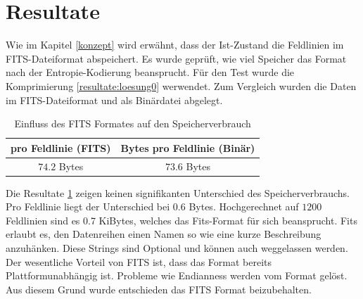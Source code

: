 \section{Resultate}\label{resultate}
Wie im Kapitel \ref{konzept} wird erwähnt, dass der Ist-Zustand die Feldlinien im FITS-Dateiformat abspeichert. Es wurde geprüft, wie viel Speicher das Format nach der Entropie-Kodierung beansprucht. Für den Test wurde die Komprimierung \ref{resultate:loesung0} werwendet. Zum Vergleich wurden die Daten im FITS-Dateiformat und als Binärdatei abgelegt.
\begin{table}[!htbp]
\center
\begin{tabular}{c|c}
	 pro Feldlinie (FITS) & Bytes pro Feldlinie (Binär)\\\hline
	$74.2$ Bytes & $73.6$ Bytes\\
\end{tabular}
\caption{Einfluss des FITS Formates auf den Speicherverbrauch}
\label{resultate:fits_table}
\end{table}
Die Resultate \ref{resultate:fits_table} zeigen keinen signifikanten Unterschied des Speicherverbrauchs. Pro Feldlinie liegt der Unterschied bei $0.6$ Bytes. Hochgerechnet auf $1200$ Feldlinien sind es 0.7 KiBytes, welches das Fits-Format für sich beansprucht. Fits erlaubt es, den Datenreihen einen Namen so wie eine kurze Beschreibung anzuhänken. Diese Strings sind Optional und können auch weggelassen werden.\\
Der wesentliche Vorteil von FITS ist, dass das Format bereits Plattformunabhängig ist. Probleme wie Endianness \cite{wiki:endianess} werden vom Format gelöst. Aus diesem Grund wurde entschieden das FITS Format beizubehalten.

